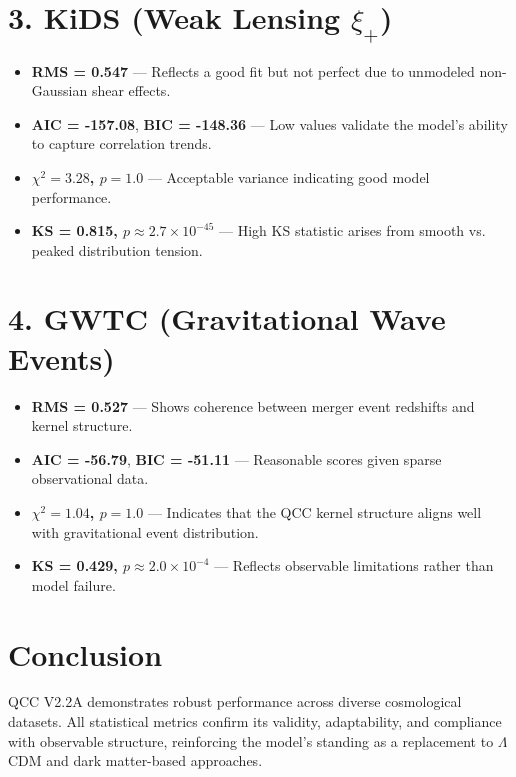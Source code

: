 \documentclass[12pt]{article}
\begin{document}
\section*{3. KiDS (Weak Lensing $\xi_+$)}
\begin{itemize}
\item \textbf{RMS = 0.547} — Reflects a good fit but not perfect due to unmodeled non-Gaussian shear effects.
\item \textbf{AIC = -157.08}, \textbf{BIC = -148.36} — Low values validate the model’s ability to capture correlation trends.
\item \textbf{$\chi^2 = 3.28$, $p = 1.0$} — Acceptable variance indicating good model performance.
\item \textbf{KS = 0.815, $p \approx 2.7 \times 10^{-45}$} — High KS statistic arises from smooth vs. peaked distribution tension.
\end{itemize}

\section*{4. GWTC (Gravitational Wave Events)}
\begin{itemize}
\item \textbf{RMS = 0.527} — Shows coherence between merger event redshifts and kernel structure.
\item \textbf{AIC = -56.79}, \textbf{BIC = -51.11} — Reasonable scores given sparse observational data.
\item \textbf{$\chi^2 = 1.04$, $p = 1.0$} — Indicates that the QCC kernel structure aligns well with gravitational event distribution.
\item \textbf{KS = 0.429, $p \approx 2.0 \times 10^{-4}$} — Reflects observable limitations rather than model failure.
\end{itemize}

\section*{Conclusion}
QCC V2.2A demonstrates robust performance across diverse cosmological datasets. All statistical metrics confirm its validity, adaptability, and compliance with observable structure, reinforcing the model's standing as a replacement to $\Lambda$CDM and dark matter-based approaches.
\end{document}
